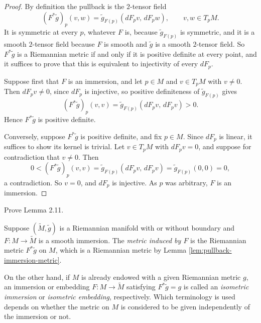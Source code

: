 \begin{proof}
\leanok
{}
By definition the pullback is the $2$-tensor field
\[
(F^*\tilde{g})_p(v,w) = \tilde{g}_{F(p)}(dF_p v,\, dF_p w), \qquad v, w \in T_p M .
\]
It is symmetric at every $p$, whatever $F$ is, because $\tilde{g}_{F(p)}$ is symmetric, and it is a smooth $2$-tensor field because $F$ is smooth and $\tilde{g}$ is a smooth $2$-tensor field. So $F^*\tilde{g}$ is a Riemannian metric if and only if it is positive definite at every point, and it suffices to prove that this is equivalent to injectivity of every $dF_p$.

Suppose first that $F$ is an immersion, and let $p \in M$ and $v \in T_p M$ with $v \neq 0$. Then $dF_p v \neq 0$, since $dF_p$ is injective, so positive definiteness of $\tilde{g}_{F(p)}$ gives
\[
(F^*\tilde{g})_p(v,v) = \tilde{g}_{F(p)}(dF_p v,\, dF_p v) > 0 .
\]
Hence $F^*\tilde{g}$ is positive definite.

Conversely, suppose $F^*\tilde{g}$ is positive definite, and fix $p \in M$. Since $dF_p$ is linear, it suffices to show its kernel is trivial. Let $v \in T_p M$ with $dF_p v = 0$, and suppose for contradiction that $v \neq 0$. Then
\[
0 < (F^*\tilde{g})_p(v,v) = \tilde{g}_{F(p)}(dF_p v,\, dF_p v) = \tilde{g}_{F(p)}(0,0) = 0,
\]
a contradiction. So $v = 0$, and $dF_p$ is injective. As $p$ was arbitrary, $F$ is an immersion.
\end{proof}

\begin{exercise}
\label{exer:prove-lemma-2-11}
\leanok
{}
Prove Lemma 2.11.
\end{exercise}

\begin{definition}
\label{def:induced-metric}
\leanok
{}
Suppose $(\tilde{M}, \tilde{g})$ is a Riemannian manifold with or without boundary and $F : M \to \tilde{M}$ is a smooth immersion. The \emph{metric induced by $F$} is the Riemannian metric $F^*\tilde{g}$ on $M$, which is a Riemannian metric by Lemma \ref{lem:pullback-immersion-metric}.
\end{definition}

On the other hand, if $M$ is already endowed with a given Riemannian metric $g$, an immersion or embedding $F : M \to \tilde{M}$ satisfying $F^*\tilde{g} = g$ is called an \emph{isometric immersion} or \emph{isometric embedding}, respectively. Which terminology is used depends on whether the metric on $M$ is considered to be given independently of the immersion or not.


